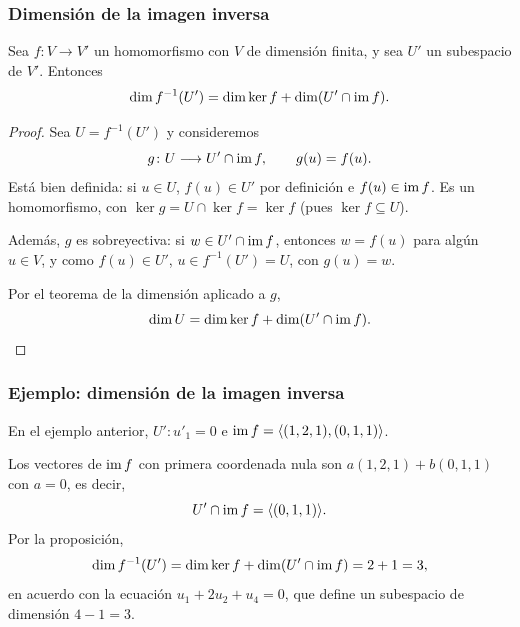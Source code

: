 \begin{frame}[allowframebreaks, t]
    \frametitle{Dimensión de la imagen inversa}

    \begin{proposition}
        Sea $f\colon V\to V'$ un homomorfismo con $V$ de dimensión finita,
        y sea $U'$ un subespacio de $V'$. Entonces
        \[
            \dim f^{-1}(U')=\dim\ker f+\dim(U'\cap\operatorname{im} f).
        \]
    \end{proposition}

    \begin{proof}
        Sea $U=f^{-1}(U')$ y consideremos
        \[
            g\colon U\longrightarrow U'\cap\operatorname{im} f,\qquad g(u)=f(u).
        \]
        Está bien definida: si $u\in U$, $f(u)\in U'$ por definición e
        $f(u)\in\operatorname{im} f$. Es un homomorfismo, con
        $\ker g=U\cap\ker f=\ker f$ (pues $\ker f\subseteq U$).

        Además, $g$ es sobreyectiva: si $w\in U'\cap\operatorname{im} f$, entonces
        $w=f(u)$ para algún $u\in V$, y como $f(u)\in U'$,
        $u\in f^{-1}(U')=U$, con $g(u)=w$.

        Por el teorema de la dimensión aplicado a $g$,
        \[
            \dim U=\dim\ker f+\dim(U'\cap\operatorname{im} f).\qedhere
        \]
    \end{proof}
\end{frame}


\begin{frame}
    \frametitle{Ejemplo: dimensión de la imagen inversa}

    En el ejemplo anterior, $U'\colon u'_1=0$ e
    $\operatorname{im} f=\langle(1,2,1),(0,1,1)\rangle$.

    \medskip

    Los vectores de $\operatorname{im} f$ con primera coordenada nula son
    $a(1,2,1)+b(0,1,1)$ con $a=0$, es decir,
    \[
        U'\cap\operatorname{im} f=\langle(0,1,1)\rangle.
    \]
    Por la proposición,
    \[
        \dim f^{-1}(U')=\dim\ker f+\dim(U'\cap\operatorname{im} f)=2+1=3,
    \]
    en acuerdo con la ecuación $u_1+2u_2+u_4=0$, que define un subespacio
    de dimensión $4-1=3$.
\end{frame}



